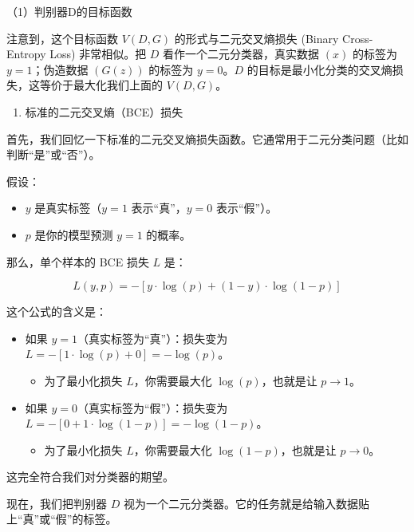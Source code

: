 （1）判别器D的目标函数

注意到，这个目标函数 \(V(D, G)\) 的形式与二元交叉熵损失 (Binary Cross-Entropy Loss) 非常相似。把 \(D\) 看作一个二元分类器，真实数据 \((x)\) 的标签为 \(y=1\)；伪造数据 \((G(z))\) 的标签为 \(y=0\)。\(D\) 的目标是最小化分类的交叉熵损失，这等价于最大化我们上面的 \(V(D, G)\)。

\begin{enumerate}
\def\labelenumi{\arabic{enumi}.}
\tightlist
\item
  标准的二元交叉熵（BCE）损失
\end{enumerate}

首先，我们回忆一下标准的二元交叉熵损失函数。它通常用于二元分类问题（比如判断``是''或``否''）。

假设：

\begin{itemize}
\tightlist
\item
  \(y\) 是真实标签（\(y=1\) 表示``真''，\(y=0\) 表示``假''）。
\item
  \(p\) 是你的模型预测 \(y=1\) 的概率。
\end{itemize}

那么，单个样本的 BCE 损失 \(L\) 是：

\[
L(y,p) = -[y\cdot\log(p) + (1-y)\cdot\log(1-p)]
\]

这个公式的含义是：

\begin{itemize}
\tightlist
\item
  如果 \(y=1\)（真实标签为``真''）：损失变为 \(L=-[1\cdot\log(p)+0]=-\log(p)\)。

  \begin{itemize}
  \tightlist
  \item
    为了最小化损失 \(L\)，你需要最大化 \(\log(p)\)，也就是让 \(p\to 1\)。
  \end{itemize}
\item
  如果 \(y=0\)（真实标签为``假''）：损失变为 \(L=-[0+1\cdot\log(1-p)]=-\log(1-p)\)。

  \begin{itemize}
  \tightlist
  \item
    为了最小化损失 \(L\)，你需要最大化 \(\log(1-p)\)，也就是让 \(p\to 0\)。
  \end{itemize}
\end{itemize}

这完全符合我们对分类器的期望。

现在，我们把判别器 \(D\) 视为一个二元分类器。它的任务就是给输入数据贴上``真''或``假''的标签。

